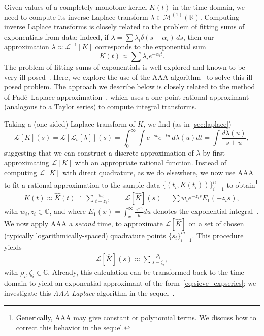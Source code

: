 \documentclass{cams-l} %
\newcommand{\RR}{\mathbb R}
\newcommand{\cL}{\mathcal L}
\newcommand{\cM}{\mathcal M}
\theoremstyle{definition}
\theoremstyle{remark}
\numberwithin{equation}{section}
\begin{document}
Given values of a completely monotone kernel $K(t)$ in the time domain, we need to compute its inverse Laplace transform $\lambda\in\cM^{(1)}(\RR)$. Computing inverse Laplace transforms is closely related to the problem of fitting sums of exponentials from data; indeed, if $\lambda = \sum \lambda_i\delta(s-\alpha_i)\,ds$, then our approximation $\lambda\approx\cL^{-1}[K]$ corresponds to the exponential sum
\begin{equation}\label{eq:sieve_expseries}
    K(t)\approx \sum \lambda_i e^{-\alpha_i t}.
\end{equation}
The problem of fitting sums of exponentials is well-explored and known to be very ill-posed~\cite{van1993resolvability, waterfall2006sloppy, hauer1990initial, yeramian1987analysis}. Here, we explore the use of the AAA algorithm~\cite{nakatsukasa2018aaa} to solve this ill-posed problem. The approach we describe below is closely related to the method of Pad\'{e}--Laplace approximation~\cite{yeramian1987analysis}, which uses a one-point rational approximant (analogous to a Taylor series) to compute integral transforms.


Taking a (one-sided) Laplace transform of $K$, we find (as in \cref{sec:laplace})
\begin{equation}\label{eq:LK}
    \cL[K](s) = \cL[\cL_b[\lambda]](s) = \int_0^\infty\int e^{-st}e^{-tu}\,d\lambda(u)dt = \int \frac{d\lambda(u)}{s+u},
\end{equation}
suggesting that we can construct a discrete approximation of $\lambda$ by first approximating $\cL[K]$ with an appropriate rational function. Instead of computing $\cL[K]$ with direct quadrature, as we do elsewhere, we now use AAA to fit a rational approximation to the sample data $\{(t_i, K(t_i))\}_{i=1}^n$ to obtain\footnote{Generically, AAA may give constant or polynomial terms. We discuss how to correct this behavior in the sequel.}
\begin{align*}
    K(t) \approx \widehat{K}(t) \doteq \sum \frac{w_i}{t - z_i},\qquad \cL[\widehat{K}](s) = \sum w_ie^{-z_is}E_1(-z_is),
\end{align*}
with $w_i, z_i \in \mathbb{C}$, and where $E_1(x) = \int_x^\infty \frac{e^{-u}}{u}du$ denotes the exponential integral~\cite{abramowitz1965handbook}. We now apply AAA a \emph{second} time, to approximate $\cL[\widehat{K}]$ on a set of chosen (typically logarithmically-spaced) quadrature points $\{s_i\}_{i=1}^m$. This procedure yields
\begin{align*}
    \cL[\widehat{K}](s) \approx \sum \frac{\rho_i}{s - \zeta_i},
\end{align*}
with $\rho_i, \zeta_i \in \mathbb{C}$. Already, this calculation can be transformed back to the time domain to yield an exponential approximant of the form~\cref{eq:sieve_expseries}; we investigate this \emph{AAA-Laplace} algorithm in the sequel~\cite{sieve}.
\end{document}
